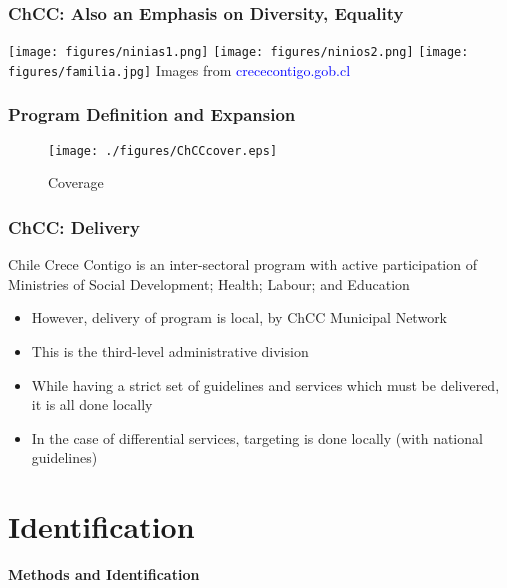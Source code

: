 \documentclass[10pt,letterpaper,subeqn,table]{beamer}
\begin{document}
\begin{frame}
  \frametitle{ChCC: Also an Emphasis on Diversity, Equality}
\hfil\hfil\texttt{[image: figures/ninias1.png]}\hfil\hfil
\texttt{[image: figures/ninios2.png]}\newline
\null\hfil\hfil\makebox[5cm]{}
\hfil\hfil\makebox[5cm]{}
\vfil
\hfil\hfil\texttt{[image: figures/familia.jpg]}\newline
\null\hfil\hfil\makebox[5cm]{}\newline
{\footnotesize Images from \textcolor{blue}{crececontigo.gob.cl}}
\end{frame}

\begin{frame}
\frametitle{Program Definition and Expansion}
\begin{figure}[htpb!]
  \begin{center}
  \centering
  \caption{Coverage}
  \texttt{[image: ./figures/ChCCcover.eps]}
  \label{fig:ChCCcover}
\end{center}
\end{figure}
\end{frame}

\begin{frame}
\frametitle{ChCC: Delivery}
Chile Crece Contigo is an inter-sectoral program with active participation of Ministries of Social Development; Health; Labour; and Education \vspace{3mm}
\begin{itemize}
\item However, delivery of program is local, by ChCC Municipal Network
\item This is the third-level administrative division
\item While having a strict set of guidelines and services which must be delivered, it is all done locally
\item In the case of differential services, targeting is done locally (with national guidelines)
\end{itemize}
\end{frame}

\section{Identification}
\begin{frame}
\begin{center}
  \textbf{Methods and Identification}
\end{center}
\end{frame}
\end{document}
